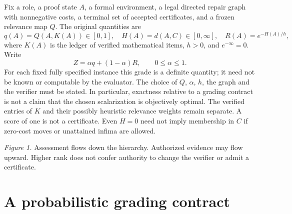 \documentclass[11pt,letterpaper]{article}
\theoremstyle{definition}\newtheorem{definition}[theorem]{Definition}\newtheorem{example}[theorem]{Example}\newtheorem{conjecture}[theorem]{Conjecture}
\begin{document}
Fix a role, a proof state $A$, a formal environment, a legal directed repair graph with nonnegative costs, a terminal set of accepted certificates, and a frozen relevance map $Q$. The original quantities are
\[
 q(A)=Q(A,K(A))\in[0,1],\quad H(A)=d(A,C)\in[0,\infty],\quad R(A)=e^{-H(A)/h},
\]
where $K(A)$ is the ledger of verified mathematical items, $h>0$, and $e^{-\infty}=0$. Write
\begin{equation}\label{eq:grade}
 Z=\alpha q+(1-\alpha)R,\qquad 0\leq\alpha\leq1.
\end{equation}
For each fixed fully specified instance this grade is a definite quantity; it need not be known or computable by the evaluator. The choice of $Q$, $\alpha$, $h$, the graph and the verifier must be stated. In particular, exactness relative to a grading contract is not a claim that the chosen scalarization is objectively optimal. The verified entries of $K$ and their possibly heuristic relevance weights remain separate. A score of one is not a certificate. Even $H=0$ need not imply membership in $C$ if zero-cost moves or unattained infima are allowed.

\begin{center}
\end{center}
\textit{Figure 1.} Assessment flows down the hierarchy. Authorized evidence may flow upward. Higher rank does not confer authority to change the verifier or admit a certificate.
\section{A probabilistic grading contract}
\end{document}
